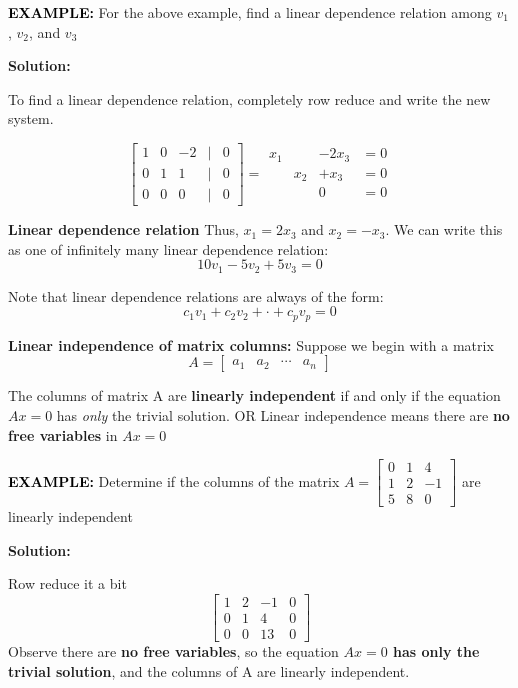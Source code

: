 \documentclass[12pt]{article}
\newcommand{\solution}{\noindent\textbf{Solution:}\par\nopagebreak}
\newcommand{\example}[1]{\noindent\textcolor{black}{\textbf{EXAMPLE:}} #1 \par}
\newcommand{\definition}[2]{
  \noindent\textbf{#1:} #2
}
\begin{document}
\vspace{20px}

\example{For the above example, find a linear dependence relation among $v_1$, $v_2$, and $v_3$}
\solution
To find a linear dependence relation, completely row reduce and write the new system.

\[
\begin{bmatrix}
    1 & 0 & -2 & \vert & 0\\
    0 & 1 & 1 & \vert & 0\\
    0 & 0 & 0 & \vert & 0
    \end{bmatrix}
 =
\begin{aligned}
    x_1 & \phantom{x_2} & - 2x_3 & = 0 \\
    \phantom{x_1} & x_2 &  + x_3 & = 0\\
    \phantom{x_1} & \phantom{x_2} & 0 & = 0
\end{aligned}
\]
\begin{keyconceptbox}
    \textbf{Linear dependence relation}
    \newline
    \newline
    Thus, $x_1 = 2x_3$ and $x_2 = -x_3$. We can write this as one of infinitely many linear dependence relation:
\[
    10v_1 - 5v_2 + 5v_3 = 0
\]

Note that linear dependence relations are always of the form:
\[
    c_1v_1 + c_2v_2 + \cdot + c_pv_p = 0
\]
\end{keyconceptbox}

\begin{keyconceptbox}
    \definition{Linear independence of matrix columns}{Suppose we begin with a matrix 
    \[A=\begin{bmatrix}
        a_1 & a_2 & \cdots & a_n
    \end{bmatrix}\]}
    The columns of matrix A are \textbf{linearly independent} if and only if the equation $Ax=0$ has \textit{only} the trivial solution.
    \newline
    \newline
    OR
    \newline
    \newline
    Linear independence means there are \textbf{no free variables} in $Ax=0$
\end{keyconceptbox}

\example{Determine if the columns of the matrix $A=\begin{bmatrix}
    0 & 1 & 4 \\
    1 & 2 & -1 \\
    5 & 8 & 0
\end{bmatrix}$ are linearly independent}
\solution
Row reduce it a bit \[
\begin{bmatrix}
    1 & 2 & -1 & 0\\
    0 & 1 & 4 & 0\\
    0 & 0 & 13 & 0
\end{bmatrix}
\]
Observe there are \textbf{no free variables}, so the equation \textbf{$Ax=0$ has only the trivial solution}, and the columns of A are linearly independent.
\end{document}
